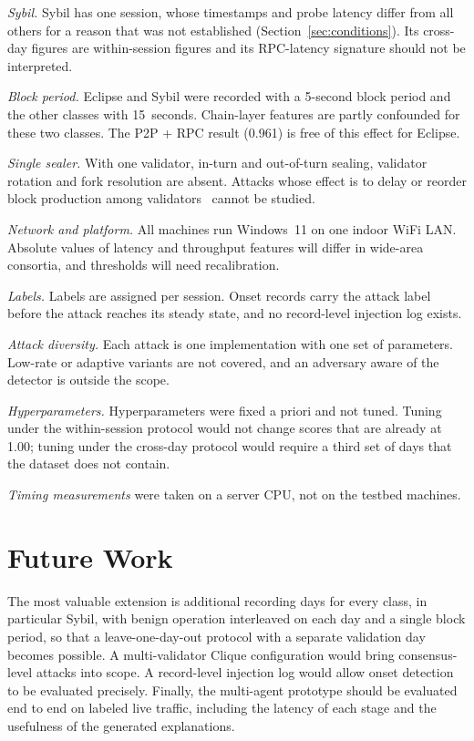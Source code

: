 \documentclass[journal]{IEEEtran}
\begin{document}
\emph{Sybil.} Sybil has one session, whose timestamps and probe latency differ from all others for a reason that was not established (Section~\ref{sec:conditions}). Its cross-day figures are within-session figures and its RPC-latency signature should not be interpreted.

\emph{Block period.} Eclipse and Sybil were recorded with a 5-second block period and the other classes with 15~seconds. Chain-layer features are partly confounded for these two classes. The P2P + RPC result (0.961) is free of this effect for Eclipse.

\emph{Single sealer.} With one validator, in-turn and out-of-turn sealing, validator rotation and fork resolution are absent. Attacks whose effect is to delay or reorder block production among validators~\cite{ekparinya2020} cannot be studied.

\emph{Network and platform.} All machines run Windows~11 on one indoor WiFi LAN. Absolute values of latency and throughput features will differ in wide-area consortia, and thresholds will need recalibration.

\emph{Labels.} Labels are assigned per session. Onset records carry the attack label before the attack reaches its steady state, and no record-level injection log exists.

\emph{Attack diversity.} Each attack is one implementation with one set of parameters. Low-rate or adaptive variants are not covered, and an adversary aware of the detector is outside the scope.

\emph{Hyperparameters.} Hyperparameters were fixed a priori and not tuned. Tuning under the within-session protocol would not change scores that are already at 1.00; tuning under the cross-day protocol would require a third set of days that the dataset does not contain.

\emph{Timing measurements} were taken on a server CPU, not on the testbed machines.

\section{Future Work}\label{sec:future}
The most valuable extension is additional recording days for every class, in particular Sybil, with benign operation interleaved on each day and a single block period, so that a leave-one-day-out protocol with a separate validation day becomes possible. A multi-validator Clique configuration would bring consensus-level attacks into scope. A record-level injection log would allow onset detection to be evaluated precisely. Finally, the multi-agent prototype should be evaluated end to end on labeled live traffic, including the latency of each stage and the usefulness of the generated explanations.
\end{document}

